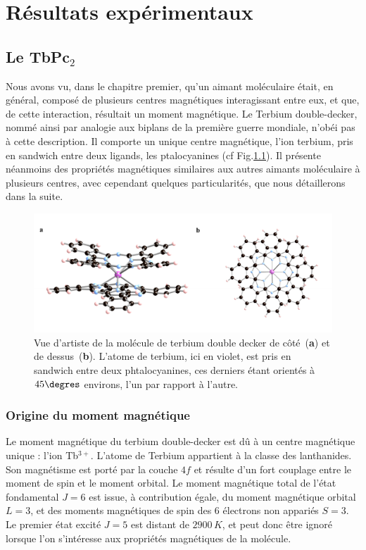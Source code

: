\chapter{Résultats expérimentaux}

\section{Le TbPc$_2$}
Nous avons vu, dans le chapitre premier, qu'un aimant moléculaire était, en général, composé de plusieurs centres magnétiques interagissant entre eux, et que, de cette interaction, résultait un moment magnétique. Le Terbium double-decker, nommé ainsi par analogie aux biplans de la première guerre mondiale, n’obéi pas à cette description. Il comporte un unique centre magnétique, l'ion terbium, pris en sandwich entre deux ligands, les ptalocyanines (cf Fig.\ref{TbPc2Imag}). Il présente néanmoins des propriétés magnétiques similaires aux autres aimants moléculaire à plusieurs centres, avec cependant quelques particularités, que nous détaillerons dans la suite.

\begin{figure}
\centering \includegraphics[scale=0.45]{Resultats/TbPc2Imag/TbPc2Imag.pdf} 
\caption{Vue d'artiste de la molécule de terbium double decker de côté~(\textbf{a}) et de dessus~(\textbf{b}). L'atome de terbium, ici en violet, est pris en sandwich entre deux phtalocyanines, ces derniers étant orientés à $45\degres$ environs, l'un par rapport à l'autre.}
\label{TbPc2Imag}
\end{figure}





\subsection{Origine du moment magnétique}
Le moment magnétique du terbium double-decker est d\^u à un centre magnétique unique : l'ion Tb$^{3+}$. L'atome de Terbium appartient à la classe des lanthanides. Son magnétisme est porté par la couche $4f$ et résulte d'un fort couplage entre le moment de spin et le moment orbital. Le moment magnétique total de l'état fondamental $J=6$ est issue, à contribution égale, du moment magnétique orbital $L=3$, et des moments magnétiques de spin des 6 électrons non appariés $S=3$. Le premier état excité $J=5$ est distant de $2900\,K$, et peut donc \^etre ignoré lorsque l'on s'intéresse aux propriétés magnétiques de la molécule.
 

